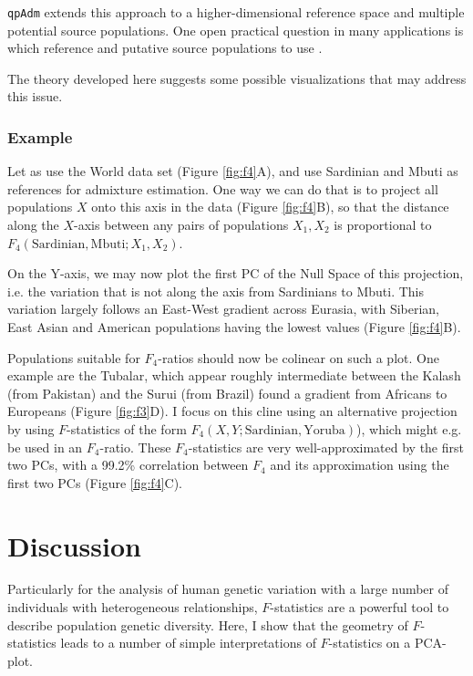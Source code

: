 \documentclass[12pt,fullpage, a4paper]{article}
\begin{document}
\texttt{qpAdm} extends this approach to a higher-dimensional reference space and multiple potential source populations.  One open practical question in many applications is which reference and putative source populations to use \citep{harney2021}. 


The theory developed here suggests some possible visualizations that may address this issue. 


\subsubsection{Example}
Let as use the World data set (Figure \ref{fig:f4}A), and use Sardinian and Mbuti as references for admixture estimation. One way we can do that is to project all populations $X$ onto this axis in the data (Figure \ref{fig:f4}B), so that the distance along the $X$-axis between any pairs of populations $X_1, X_2$ is proportional to $F_4(\text{Sardinian}, \text{Mbuti}; X_1, X_2)$.

On the Y-axis, we may now plot the first PC of the Null Space of this projection, i.e. the variation that is not along the axis from Sardinians to Mbuti. This variation largely follows an East-West gradient across Eurasia, with Siberian, East Asian and American populations having the lowest values (Figure \ref{fig:f4}B).

Populations suitable for $F_4$-ratios should now be colinear on such a plot. One example are the Tubalar, which appear roughly intermediate between the Kalash (from Pakistan) and the Surui (from Brazil)
 found a gradient from Africans to Europeans (Figure \ref{fig:f3}D). I focus on this cline using an alternative projection by using  $F$-statistics of the form $F_4(X, Y; \text{Sardinian}, \text{Yoruba})$), which might e.g. be used in an $F_4$-ratio.  These $F_4$-statistics are very well-approximated by the first two PCs, with a 99.2\% correlation between $F_4$ and its approximation using the first two PCs (Figure \ref{fig:f4}C).



\section{Discussion}
Particularly for the analysis of human genetic variation with a large number of individuals with heterogeneous relationships, $F$-statistics  are  a powerful tool to describe population genetic diversity. Here, I show that the geometry of $F$-statistics \citep{oteo-garcia2021} leads to a number of simple interpretations of $F$-statistics on a PCA-plot. 
\end{document}
